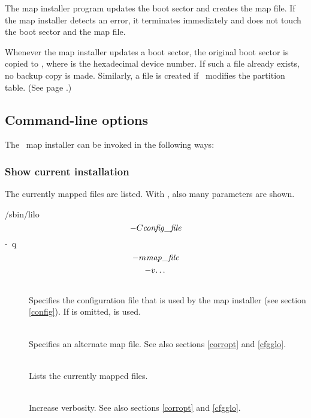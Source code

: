 The map installer program  updates the boot sector
and creates the map file. If the map installer detects an error, it terminates
immediately and does not touch the boot sector and the map file.

Whenever the map installer updates a boot sector, the original boot
sector is copied
to , where  is the
hexadecimal device number. If such a file already exists, no backup
copy is made. Similarly, a file  is
created if \LILO\ modifies the partition table. (See page \pageref{fix-table}.)


\subsection{Command-line options}

The \LILO\ map installer can be invoked in the following ways:


\def\seealso{See also sections \ref{corropt} and \ref{cfgglo}.}

\subsubsection{Show current installation}
\label{invshow}

The currently mapped files are listed. With , also many parameters
are shown.

\begin{command}
  /sbin/lilo
    \unit{\[ -C {\it config\_file\/} \]}
    \unit{-q}
    \unit{\[ -m {\it map\_file\/} \]}
    \unit{\[ -v $\ldots$ \]}
\end{command}

\begin{description}
  \item[]~\\
    Specifies the configuration file that is used by the map
    installer (see section \ref{config}). If  is omitted,
     is used.
  \item[]~\\
    Specifies an alternate map file. \seealso
  \item[]~ \\
    Lists the currently mapped files.
  \item[]~\\
    Increase verbosity. \seealso
\end{description}


